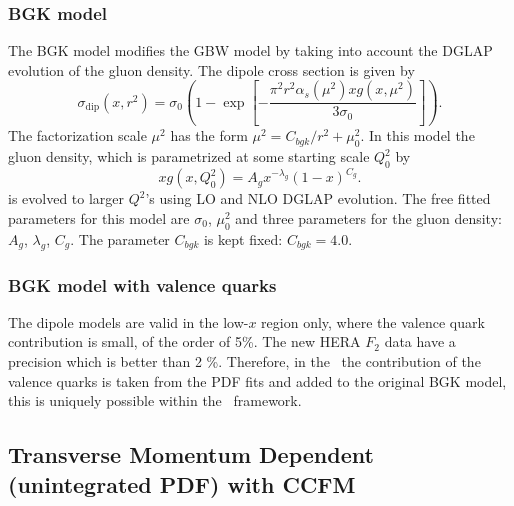 \subsubsection{BGK model}

The BGK model modifies the GBW model by taking into account the  DGLAP evolution
of the gluon density. 
The dipole cross section is given by
\begin{equation*}
\label{eBGK}
   \sigma_{\text{dip}}(x,r^{2}) = \sigma_{0} 
\left(1 - \exp \left[-\frac{\pi^{2} r^{2} \alpha_{s}(\mu^{2}) xg(x,\mu^{2})}{3 \sigma_{0}} \right]\right).
\end{equation*}
The factorization scale $\mu^{2}$ has the form $\mu^{2} = C_{bgk}/r^{2}+\mu^{2}_{0}$.
In this model the gluon density, which  is parametrized  at some starting scale $Q_{0}^{2}$ by
\begin{equation*}
\label{eqTH730}
   xg(x,Q^{2}_{0}) = A_{g} x^{-\lambda_{g}}(1-x)^{C_{g}}.
\end{equation*}
is evolved to larger $Q^2$'s using LO and NLO DGLAP evolution.
The free fitted parameters for this model are $\sigma_{0}$, $\mu^{2}_{0}$ and three parameters for the gluon density: $A_{g}$, $\lambda_{g}$, $C_{g}$. The parameter $C_{bgk}$ is kept fixed: $C_{bgk} = 4.0$. 

\subsubsection{BGK model with valence quarks}

The dipole models are valid in the low-$x$ region only, where the valence quark contribution is small, of the order of 5\%. The new HERA $F_2$ data have a precision which is  better than 2 \%. Therefore, in the \fitter\ the contribution of the valence quarks is taken from the PDF fits and added to the original 
BGK model, this is uniquely possible within the \fitter\ framework.

\subsection{Transverse Momentum Dependent (unintegrated PDF) with CCFM}


